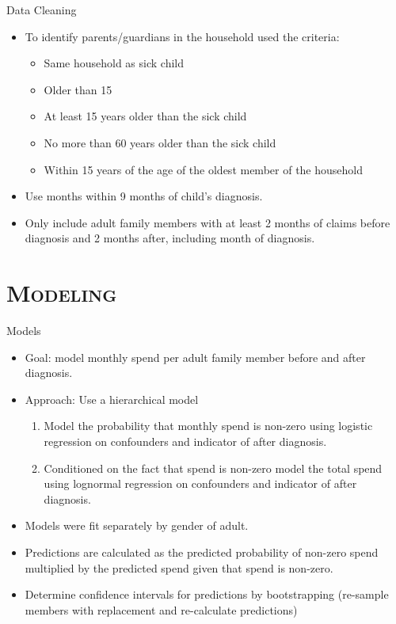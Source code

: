 \documentclass[xcolor=x11names,compress]{beamer}
\renewcommand{\(}{\begin{columns}}
\renewcommand{\)}{\end{columns}}
\newcommand{\<}[1]{\begin{column}{#1}}
\renewcommand{\>}{\end{column}}
\begin{document}
\begin{frame}{Data Cleaning }
\begin{itemize}
	\item To identify parents/guardians in the household used the criteria:
		\begin{itemize}
			\item Same household as sick child
			\item Older than 15
			\item At least 15 years older than the sick child 
			\item No more than 60 years older than the sick child
			\item Within 15 years of the age of the oldest member of the household
		\end{itemize} 
	\item Use months within 9 months of child's diagnosis. 
	\item Only include adult family members with at least 2 months of claims before diagnosis and 2 months after, including month of diagnosis. 
\end{itemize}
\end{frame}


\section{\scshape Modeling}

\begin{frame}{Models}
\begin{itemize}
	\item Goal: model monthly spend per adult family member before and after diagnosis.
	\item Approach: Use a hierarchical model
	\begin{enumerate}
		\item Model the probability that monthly spend is non-zero using logistic regression on confounders and 
		indicator of after diagnosis. 
		\item Conditioned on the fact that spend is non-zero model the total spend using lognormal regression on confounders and indicator of after diagnosis. 
	\end{enumerate}	
	\item Models were fit separately by gender of adult.
	\item Predictions are calculated as the predicted probability of non-zero spend multiplied by the predicted spend given that spend is non-zero. 
	\item Determine confidence intervals for predictions by bootstrapping (re-sample members with replacement and re-calculate predictions)
\end{itemize}
\end{frame}
\end{document}
